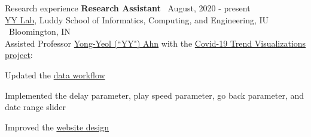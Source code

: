 \documentclass{resume}
\begin{document}
\begin{rSection}{Research experience}
{\bf Research Assistant} \hfill {\ August, 2020 - present }\\ 
{\href{http://yongyeol.com/group/}{YY Lab}, Luddy School of Informatics, Computing, and Engineering, IU} \hfill {\ {Bloomington, IN}}\\
Assisted Professor \href{http://yongyeol.com/}{Yong-Yeol (``YY") Ahn} with the \href{https://yyahn.com/covid19-dashboard/}{Covid-19 Trend Visualizations project}:
\begin{cvitems}
    \item Updated the \href{https://github.com/covid19-data/covid19-data}{data workflow}
    \item Implemented the delay parameter, play speed parameter, go back parameter, and date range slider
    \item Improved the \href{https://github.com/covid19-data/covid19-dashboard}{website design}
\end{cvitems}
\end{rSection}
\end{document}
